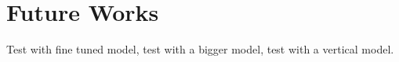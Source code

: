 \chapter{Future Works}
\label{cha:examples}

Test with fine tuned model, test with a bigger model, test with a vertical model.

\lipsum[1]